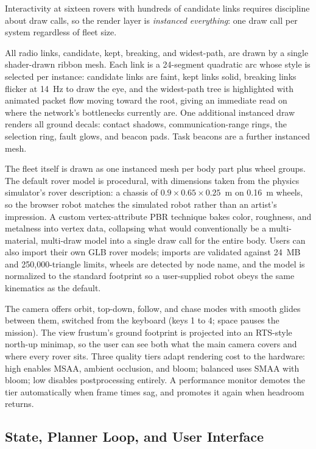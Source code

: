 Interactivity at sixteen rovers with hundreds of candidate links requires
discipline about draw calls, so the render layer is \emph{instanced
everything}: one draw call per system regardless of fleet size.

All radio links, candidate, kept, breaking, and widest-path, are drawn by
a single shader-drawn ribbon mesh. Each link is a 24-segment quadratic arc
whose style is selected per instance: candidate links are faint, kept
links solid, breaking links flicker at 14~Hz to draw the eye, and the
widest-path tree is highlighted with animated packet flow moving toward
the root, giving an immediate read on where the network's bottlenecks
currently are. One additional instanced draw renders all ground decals:
contact shadows, communication-range rings, the selection ring, fault
glows, and beacon pads. Task beacons are a further instanced mesh.

The fleet itself is drawn as one instanced mesh per body part plus wheel
groups. The default rover model is procedural, with dimensions taken from
the physics simulator's rover description: a chassis of $0.9 \times 0.65
\times 0.25$~m on 0.16~m wheels, so the browser robot matches the simulated
robot rather than an artist's impression. A custom vertex-attribute PBR
technique bakes color, roughness, and metalness into vertex data,
collapsing what would conventionally be a multi-material, multi-draw model
into a single draw call for the entire body. Users can also import their
own GLB rover models; imports are validated against 24~MB and
250{,}000-triangle limits, wheels are detected by node name, and the model
is normalized to the standard footprint so a user-supplied robot obeys the
same kinematics as the default.

The camera offers orbit, top-down, follow, and chase modes with smooth
glides between them, switched from the keyboard (keys 1 to 4; space pauses
the mission). The view frustum's ground footprint is projected into an
RTS-style north-up minimap, so the user can see both what the main camera
covers and where every rover sits. Three quality tiers adapt rendering
cost to the hardware: high enables MSAA, ambient occlusion, and bloom;
balanced uses SMAA with bloom; low disables postprocessing entirely. A
performance monitor demotes the tier automatically when frame times sag,
and promotes it again when headroom returns.


\subsection{State, Planner Loop, and User Interface}

